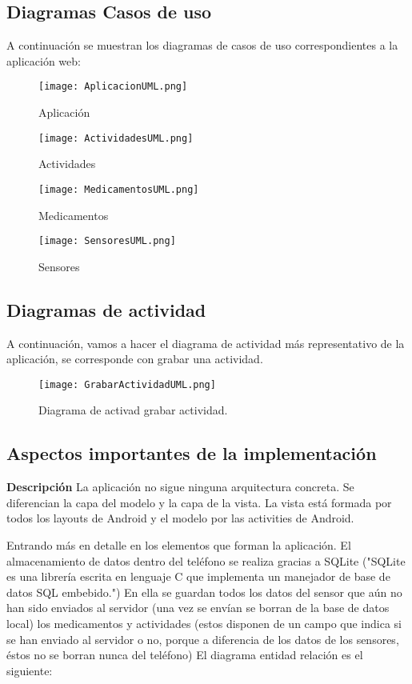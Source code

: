 \documentclass[11pt,spanish]{article}
\begin{document}
\subsection{Diagramas Casos de uso}
A continuación se muestran los diagramas de casos de uso correspondientes a la aplicación web:
\newline
\begin{figure}[!htb]
  \texttt{[image: AplicacionUML.png]}
  \caption{Aplicación}
\endminipage\hfill
{}
  \texttt{[image: ActividadesUML.png]}
  \caption{Actividades}
\endminipage\hfill
\end{figure}

\begin{figure}[!htb]
%
  \texttt{[image: MedicamentosUML.png]}
  \caption{Medicamentos}
\endminipage
{}%
  \texttt{[image: SensoresUML.png]}
  \caption{Sensores}
\endminipage
\end{figure}
\newpage

\subsection{Diagramas de actividad}
A continuación, vamos a hacer el diagrama de actividad más representativo de la aplicación, se corresponde con grabar una actividad.
\begin{figure}[h!]
  \centering
  \texttt{[image: GrabarActividadUML.png]}
  \caption{Diagrama de activad grabar actividad.}
\end{figure}
\newpage

\subsection{Aspectos importantes de la implementación}
{\bf Descripción}
\newline
\newline
La aplicación no sigue ninguna arquitectura concreta. Se diferencian la capa del modelo y la capa de la vista. La vista está formada por todos los layouts de Android y el modelo por las activities de Android.
\newline

Entrando más en detalle en los elementos que forman la aplicación. El almacenamiento de datos dentro del teléfono se realiza gracias a SQLite ("SQLite es una librería escrita en lenguaje C que implementa un manejador de base de datos SQL embebido.") En ella se guardan todos los datos del sensor que aún no han sido enviados al servidor (una vez se envían se borran de la base de datos local) los medicamentos y actividades (estos disponen de un campo que indica si se han enviado al servidor o no, porque a diferencia de los datos de los sensores, éstos no se borran nunca del teléfono) El diagrama entidad relación es el siguiente:
\newline
\end{document}
